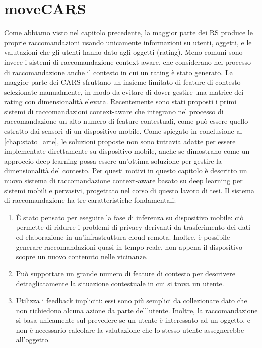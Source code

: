 \documentclass[12pt,italian]{report}
\begin{document}
\chapter{moveCARS}
\label{chap:classificatore}
Come abbiamo visto nel capitolo precedente, la maggior parte dei RS produce le proprie raccomandazioni usando unicamente informazioni su utenti, oggetti, e le valutazioni che gli utenti hanno dato agli oggetti (rating). Meno comuni sono invece i sistemi di raccomandazione context-aware, che considerano nel processo di raccomandazione anche il contesto in cui un rating è stato generato. La maggior parte dei CARS sfruttano un insieme limitato di feature di contesto selezionate manualmente, in modo da evitare di dover gestire una matrice dei rating con dimensionalità elevata. Recentemente sono stati proposti i primi sistemi di raccomandazioni context-aware che integrano nel processo di raccomandazione un alto numero di feature contestuali, come può essere quello estratto dai sensori di un dispositivo mobile. Come spiegato in conclusione al \autoref{chap:stato_arte}, le soluzioni proposte non sono tuttavia adatte per essere implementate direttamente su dispositivo mobile, anche se dimostrano come un approccio deep learning possa essere un'ottima soluzione per gestire la dimensionalità del contesto. Per questi motivi in questo capitolo è descritto un nuovo sistema di raccomandazione context-aware basato su deep learning per sistemi mobili e pervasivi, progettato nel corso di questo lavoro di tesi. Il sistema di raccomandazione ha tre caratteristiche fondamentali: 
\begin{enumerate}
\item \`E stato pensato per eseguire la fase di inferenza su dispositivo mobile: ciò permette di ridurre i problemi di privacy derivanti da trasferimento dei dati ed elaborazione in un'infrastruttura cloud remota. Inoltre, è possibile generare raccomandazioni quasi in tempo reale, non appena il dispositivo scopre un nuovo contenuto nelle vicinanze.
\item Può supportare un grande numero di feature di contesto per descrivere dettagliatamente la situazione contestuale in cui si trova un utente. 
\item Utilizza i feedback impliciti: essi sono più semplici da collezionare dato che non richiedono alcuna azione da parte dell'utente. Inoltre, la raccomandazione si basa unicamente sul prevedere se un utente è interessato ad un oggetto, e non è necessario calcolare la valutazione che lo stesso utente assegnerebbe all'oggetto.
\end{enumerate}
\end{document}
